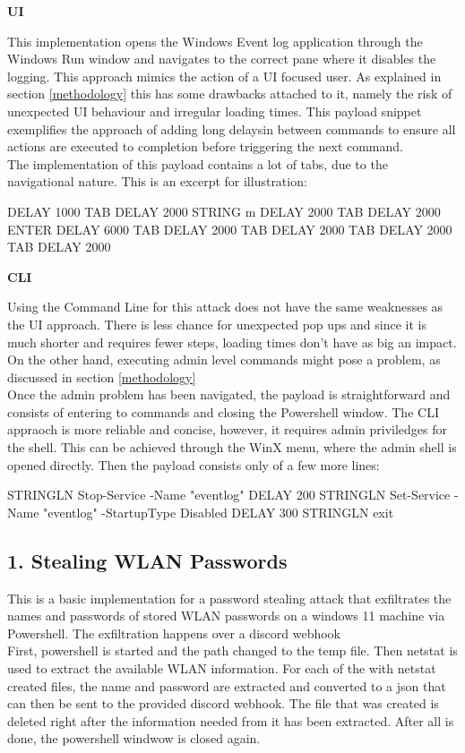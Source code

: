 \textbf{UI} 

This implementation opens the Windows Event log application through the Windows Run window and navigates to the correct pane where it disables the logging.
This approach mimics the action of a UI focused user. As explained in section \ref{methodology} this has some drawbacks attached to it, namely the risk of unexpected UI behaviour and irregular loading times. This payload snippet exemplifies the approach of adding long delaysin between commands to ensure all actions are executed to completion before triggering the next command.\\
The implementation of this payload contains a lot of tabs, due to the navigational nature. This is an excerpt for illustration:

DELAY 1000
TAB
DELAY 2000
STRING m
DELAY 2000
TAB
DELAY 2000
ENTER
DELAY 6000
TAB
DELAY 2000
TAB
DELAY 2000
TAB
DELAY 2000
TAB
DELAY 2000


\textbf{CLI}

Using the Command Line for this attack does not have the same weaknesses as the UI approach. There is less chance for unexpected pop ups and since it is much shorter and requires fewer steps, loading times don't have as big an impact. On the other hand, executing admin level commands might pose a problem, as discussed in section \ref{methodology} \\

Once the admin problem has been navigated, the payload is straightforward and consists of entering to commands and closing the Powershell window.
The CLI appraoch is more reliable and concise, however, it requires admin priviledges for the shell. This can be achieved through the WinX menu, where the admin shell is opened directly. Then the payload consists only of a few more lines:

STRINGLN Stop-Service -Name "eventlog"
DELAY 200
STRINGLN Set-Service -Name "eventlog" -StartupType Disabled
DELAY 300
STRINGLN exit


\subsection{1. Stealing WLAN Passwords}

This is a basic implementation for a password stealing attack that exfiltrates the names and passwords of stored WLAN passwords on a windows 11 machine via Powershell. The exfiltration happens over a discord webhook \\
First, powershell is started and the path changed to the temp file. Then netstat is used to extract the available WLAN information. For each of the with netstat created files, the name and password are extracted and converted to a json that can then be sent to the provided discord webhook. The file that was created is deleted right after the information needed from it has been extracted. After all is done, the powershell windwow is closed again.

